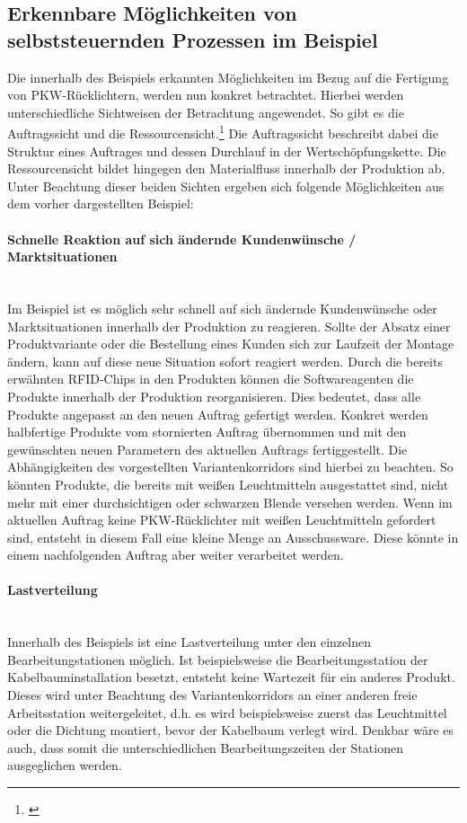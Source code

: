 \subsection{Erkennbare Möglichkeiten von selbststeuernden Prozessen im Beispiel}
\label{sec:Moeglichkeiten}

Die innerhalb des Beispiels erkannten Möglichkeiten im Bezug auf die Fertigung
von PKW-Rücklichtern, werden nun konkret betrachtet. Hierbei werden
unterschiedliche Sichtweisen der Betrachtung angewendet. So gibt es die
Auftragssicht und die Ressourcensicht.\footnote{\citet[S.~234]{arnold2008}}
Die Auftragssicht beschreibt dabei die Struktur eines Auftrages und dessen Durchlauf in der Wertschöpfungskette. Die
Ressourcensicht bildet hingegen den Materialfluss innerhalb der Produktion ab.
Unter Beachtung dieser beiden Sichten ergeben sich folgende Möglichkeiten aus
dem vorher dargestellten Beispiel:

\paragraph{Schnelle Reaktion auf sich ändernde Kundenwünsche /
Marktsituationen} \hfill \\
Im Beispiel ist es möglich sehr schnell auf sich ändernde Kundenwünsche oder
Marktsituationen innerhalb der Produktion zu reagieren. Sollte der Absatz einer
Produktvariante oder die Bestellung eines Kunden sich zur Laufzeit der Montage
ändern, kann auf diese neue Situation sofort reagiert werden. Durch die bereits
erwähnten RFID-Chips in den Produkten können die Softwareagenten die Produkte
innerhalb der Produktion reorganisieren. Dies bedeutet, dass alle Produkte
angepasst an den neuen Auftrag gefertigt werden. Konkret werden halbfertige
Produkte vom stornierten Auftrag übernommen und mit den gewünschten neuen
Parametern des aktuellen Auftrags fertiggestellt. Die Abhängigkeiten des
vorgestellten Variantenkorridors sind hierbei zu beachten. So könnten Produkte,
die bereits mit weißen Leuchtmitteln ausgestattet sind, nicht mehr mit einer
durchsichtigen oder schwarzen Blende versehen werden. Wenn im aktuellen Auftrag
keine PKW-Rücklichter mit weißen Leuchtmitteln gefordert sind, entsteht in
diesem Fall eine kleine Menge an Ausschussware. Diese könnte in einem
nachfolgenden Auftrag aber weiter verarbeitet werden.

\paragraph{Lastverteilung} \hfill \\
Innerhalb des Beispiels ist eine Lastverteilung unter den einzelnen
Bearbeitungstationen möglich. Ist beispielsweise die Bearbeitungsstation der
Kabelbauminstallation besetzt, entsteht keine Wartezeit für ein anderes Produkt.
Dieses wird unter Beachtung des Variantenkorridors an einer anderen freie
Arbeitsstation weitergeleitet, d.h. es wird beispielsweise zuerst das
Leuchtmittel oder die Dichtung montiert, bevor der Kabelbaum verlegt wird.
Denkbar wäre es auch, dass somit die unterschiedlichen Bearbeitungszeiten der
Stationen ausgeglichen werden.

